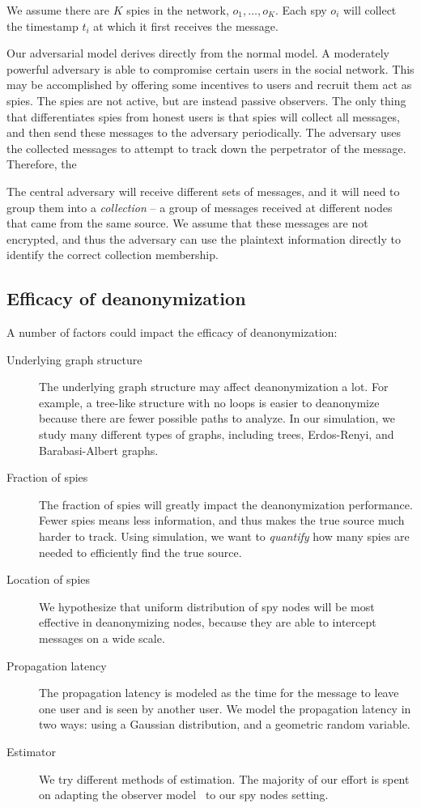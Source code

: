 We assume there are $K$ spies in the network, $o_1,\ldots,o_K$. Each spy $o_i$ will collect the timestamp $t_i$ at which it first receives the message.

Our adversarial model derives directly from the normal model. A moderately powerful adversary is able to compromise certain users in the social network. This may be accomplished by offering some incentives to users and recruit them act as spies. The spies are not active, but are instead passive observers. The only thing that differentiates spies from honest users is that spies will collect all messages, and then send these messages to the adversary periodically. The adversary uses the collected messages to attempt to track down the perpetrator of the message. Therefore, the 

The central adversary will receive different sets of messages, and it will need to group them into a \emph{collection} -- a group of messages received at different nodes that came from the same source. We assume that these messages are not encrypted, and thus the adversary can use the plaintext information directly to identify the correct collection membership. 

\subsection{Efficacy of deanonymization}

A number of factors could impact the efficacy of deanonymization:

\begin{description}
\item[Underlying graph structure] The underlying graph structure may affect deanonymization a lot. For example, a tree-like structure with no loops is easier to deanonymize because there are fewer possible paths to analyze. In our simulation, we study many different types of graphs, including trees, Erdos-Renyi, and Barabasi-Albert graphs.
\item[Fraction of spies] The fraction of spies will greatly impact the deanonymization performance. Fewer spies means less information, and thus makes the true source much harder to track. Using simulation, we want to \emph{quantify} how many spies are needed to efficiently find the true source.
\item[Location of spies] We hypothesize that uniform distribution of spy nodes will be most effective in deanonymizing nodes, because they are able to intercept messages on a wide scale. 
\item[Propagation latency] The propagation latency is modeled as the time for the message to leave one user and is seen by another user. 
We model the propagation latency in two ways: using a Gaussian distribution, and a geometric random variable. 
\item[Estimator] We try different methods of estimation. The majority of our effort is spent on adapting the observer model~\cite{pinto} to our spy nodes setting.
\end{description}

